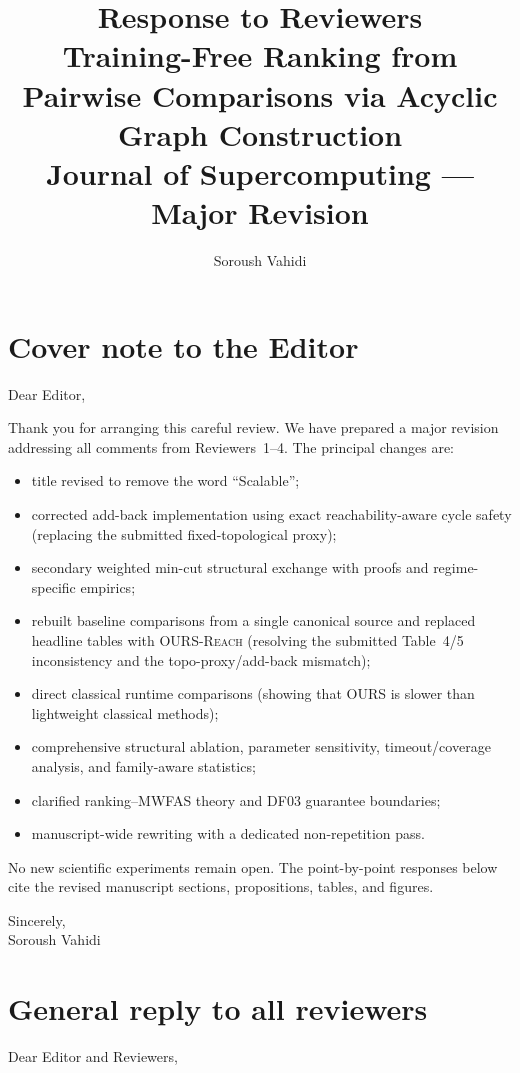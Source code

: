 \documentclass[11pt]{article}
\title{Response to Reviewers\\[0.4em]
\large Training-Free Ranking from Pairwise Comparisons via Acyclic Graph Construction\\[0.2em]
\normalsize Journal of Supercomputing --- Major Revision}
\author{Soroush Vahidi}
\date{}
\begin{document}
\maketitle

\section*{Cover note to the Editor}

Dear Editor,

Thank you for arranging this careful review. We have prepared a major revision addressing all comments from Reviewers~1--4. The principal changes are:
\begin{itemize}
\item title revised to remove the word ``Scalable'';
\item corrected add-back implementation using exact reachability-aware cycle safety (replacing the submitted fixed-topological proxy);
\item secondary weighted min-cut structural exchange with proofs and regime-specific empirics;
\item rebuilt baseline comparisons from a single canonical source and replaced headline tables with \textsc{OURS-Reach} (resolving the submitted Table~4/5 inconsistency and the topo-proxy/add-back mismatch);
\item direct classical runtime comparisons (showing that OURS is slower than lightweight classical methods);
\item comprehensive structural ablation, parameter sensitivity, timeout/coverage analysis, and family-aware statistics;
\item clarified ranking--MWFAS theory and DF03 guarantee boundaries;
\item manuscript-wide rewriting with a dedicated non-repetition pass.
\end{itemize}
No new scientific experiments remain open. The point-by-point responses below cite the revised manuscript sections, propositions, tables, and figures.

\vspace{0.8em}
\noindent Sincerely,\\
Soroush Vahidi

\section*{General reply to all reviewers}

Dear Editor and Reviewers,
\end{document}
